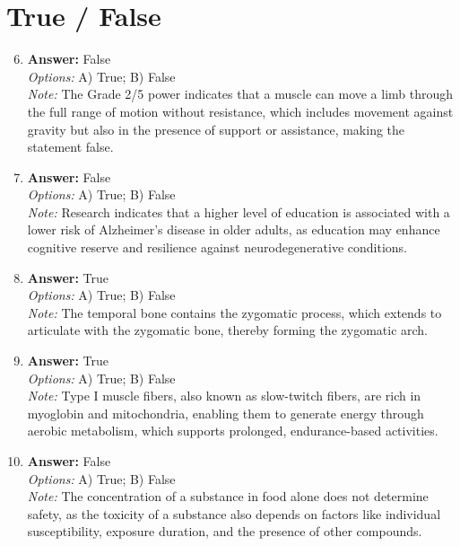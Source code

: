 \documentclass[12pt]{article}
\begin{document}
\section*{True / False}
\begin{enumerate}[label=\arabic*.]
\setcounter{enumi}{5}
\item \textbf{Answer:} False
\\ \textit{Options:} A) True; B) False
\\ \textit{Note:} The Grade 2/5 power indicates that a muscle can move a limb through the full range of motion without resistance, which includes movement against gravity but also in the presence of support or assistance, making the statement false.
\item \textbf{Answer:} False
\\ \textit{Options:} A) True; B) False
\\ \textit{Note:} Research indicates that a higher level of education is associated with a lower risk of Alzheimer's disease in older adults, as education may enhance cognitive reserve and resilience against neurodegenerative conditions.
\item \textbf{Answer:} True
\\ \textit{Options:} A) True; B) False
\\ \textit{Note:} The temporal bone contains the zygomatic process, which extends to articulate with the zygomatic bone, thereby forming the zygomatic arch.
\item \textbf{Answer:} True
\\ \textit{Options:} A) True; B) False
\\ \textit{Note:} Type I muscle fibers, also known as slow-twitch fibers, are rich in myoglobin and mitochondria, enabling them to generate energy through aerobic metabolism, which supports prolonged, endurance-based activities.
\item \textbf{Answer:} False
\\ \textit{Options:} A) True; B) False
\\ \textit{Note:} The concentration of a substance in food alone does not determine safety, as the toxicity of a substance also depends on factors like individual susceptibility, exposure duration, and the presence of other compounds.
\end{enumerate}
\end{document}
